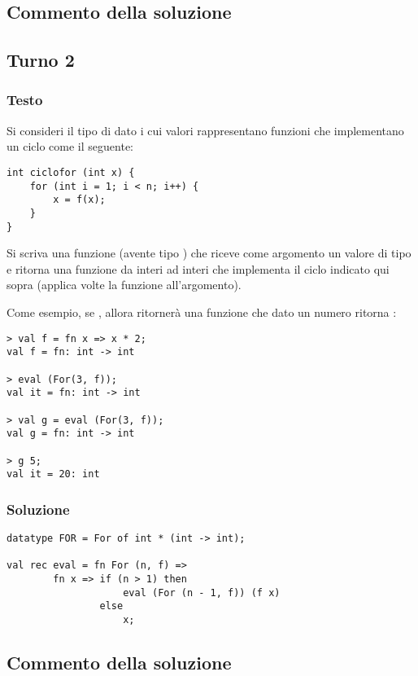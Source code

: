 \subsection{Commento della soluzione}

\omissis


\subsection{Turno 2}

\subsubsection{Testo}

Si consideri il tipo di dato  i cui valori  rappresentano funzioni che implementano un ciclo  come il seguente:

\begin{lstlisting}[style = SML, caption = {Esempio di ciclo for in \sml{C}}]
int ciclofor (int x) {
	for (int i = 1; i < n; i++) {
		x = f(x);
	}
}
\end{lstlisting}

Si scriva una funzione  (avente tipo ) che riceve come argomento un valore di tipo  e ritorna una funzione da interi ad interi che implementa il ciclo indicato qui sopra (applica  volte la funzione  all'argomento).

\medskip
Come esempio, se , allora  ritornerà una funzione che dato un numero  ritorna :

\begin{lstlisting}[style = SML]
> val f = fn x => x * 2;
val f = fn: int -> int

> eval (For(3, f));
val it = fn: int -> int

> val g = eval (For(3, f));
val g = fn: int -> int

> g 5;
val it = 20: int
\end{lstlisting}

\subsubsection{Soluzione}

\begin{lstlisting}[style = SML, caption = {definizione della funzione \sml{eval}}]
datatype FOR = For of int * (int -> int);

val rec eval = fn For (n, f) =>
		fn x => if (n > 1) then
					eval (For (n - 1, f)) (f x)
				else
					x;
\end{lstlisting}

\subsection{Commento della soluzione}

\omissis
